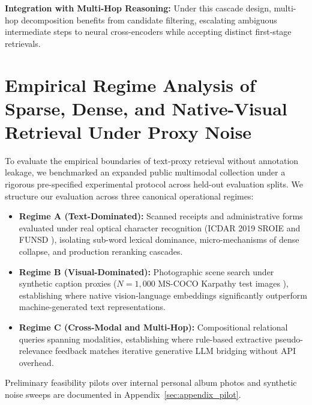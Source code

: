 \documentclass[conference]{IEEEtran}
\begin{document}
\textbf{Integration with Multi-Hop Reasoning:} Under this cascade design, multi-hop decomposition benefits from candidate filtering, escalating ambiguous intermediate steps to neural cross-encoders while accepting distinct first-stage retrievals.


\section{Empirical Regime Analysis of Sparse, Dense, and Native-Visual Retrieval Under Proxy Noise}
\label{sec:regime_analysis}
\label{sec:public_regime_analysis}

To evaluate the empirical boundaries of text-proxy retrieval without annotation leakage, we benchmarked an expanded public multimodal collection under a rigorous pre-specified experimental protocol across held-out evaluation splits. We structure our evaluation across three canonical operational regimes:
\begin{itemize}
    \setlength{\itemsep}{0.2pt plus 0.1pt}
    \setlength{\parskip}{0pt}
    \item \textbf{Regime A (Text-Dominated):} Scanned receipts and administrative forms evaluated under real optical character recognition (ICDAR 2019 SROIE \cite{huang2019sroie} and FUNSD \cite{jaume2019funsd}), isolating sub-word lexical dominance, micro-mechanisms of dense collapse, and production reranking cascades.
    \item \textbf{Regime B (Visual-Dominated):} Photographic scene search under synthetic caption proxies ($N=1{,}000$ MS-COCO Karpathy test images \cite{lin2014coco}), establishing where native vision-language embeddings significantly outperform machine-generated text representations.
    \item \textbf{Regime C (Cross-Modal and Multi-Hop):} Compositional relational queries spanning modalities, establishing where rule-based extractive pseudo-relevance feedback matches iterative generative LLM bridging without API overhead.
\end{itemize}
Preliminary feasibility pilots over internal personal album photos and synthetic noise sweeps are documented in Appendix~\ref{sec:appendix_pilot}.
\end{document}
